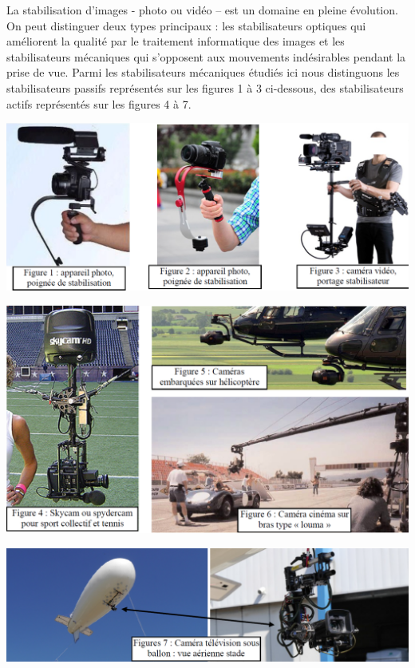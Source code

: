 \documentclass[10pt,fleqn]{article} %
\begin{document}

\vspace{5cm}
\pagestyle{fancy}
\thispagestyle{plain}

\def\columnseprulecolor{\color{white}}
\setlength{\columnseprule}{0.4pt} 



La stabilisation d’images - photo ou vidéo – est un domaine en pleine évolution. On peut distinguer deux types principaux : les stabilisateurs optiques qui améliorent la qualité par le traitement informatique des images et les stabilisateurs mécaniques qui s’opposent aux mouvements indésirables pendant la prise de vue. Parmi les stabilisateurs mécaniques étudiés ici nous distinguons les stabilisateurs passifs représentés sur les figures 1 à 3 ci-dessous, des stabilisateurs actifs représentés sur les figures 4 à 7. 

\begin{center}
\includegraphics[width=.8\linewidth]{images/FIG_01}
\end{center}

\begin{center}
\includegraphics[width=.8\linewidth]{images/FIG_02}
\end{center}

\begin{center}
\includegraphics[width=.8\linewidth]{images/FIG_03}
\end{center}
\end{document}
